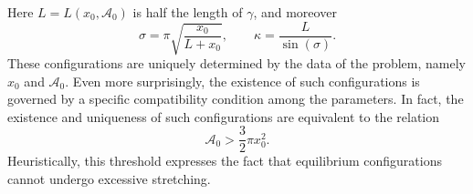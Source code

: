 \documentclass[11pt]{amsart}
\newcommand{\A}{\mathcal A}
\renewcommand{\k}{\kappa}
\theoremstyle{definition}
\theoremstyle{remark}
\numberwithin{equation}{section}
\begin{document}
	Here $L=L(x_0,\A_0)$ is half the length of $\gamma$, and moreover
	\begin{equation*}
		\sigma=\pi\sqrt{\frac{x_0}{L+x_0}},\qquad \k=\frac{L}{ \sin\left(\sigma\right)}.
	\end{equation*}
	These configurations are uniquely determined by the data of the problem, namely $x_0$ and $\A_0$. Even more surprisingly, the existence of such configurations is governed by a specific compatibility condition among the parameters. In fact, the existence and uniqueness of such configurations are equivalent to the relation
	\begin{equation}\label{intro_treshold}
		\A_0>\frac{3}{2}\pi x_0^2.
	\end{equation}
	Heuristically, this threshold expresses the fact that equilibrium configurations cannot undergo excessive stretching.
	
\end{document}
